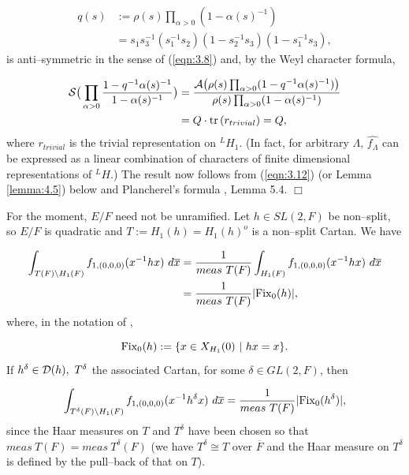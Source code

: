 \documentclass[12pt,letterpaper]{article}
\def\ddd{{\cal D}}
\def\sss{{\cal S}}
\def\qed{$\Box$}
\def\ovF{\overline{F}}
\def\ovx{\overline{x}}
\begin{document}
\begin{equation}
\label{eqn:3.9}
\begin{split}
q(s)
&:=\rho (s)\prod_{\alpha >0}(1-\alpha (s)^{-1})\\
&=s_1s_3^{-1}(s_1^{-1}s_2)(1-s_2^{-1}s_3)(1-s_1^{-1}s_3),
\end{split}
\end{equation}
is anti--symmetric in the sense of (\ref{eqn:3.8}) and, by the Weyl character
formula,

\begin{equation}
\label{eqn:3.10}
\begin{split}
\sss \big(\prod_{\alpha >0}
{1-q^{-1}\alpha (s)^{-1}\over{1-\alpha (s)^{-1}}}\big)
&={{{\cal A} \big(\rho (s)\prod_{\alpha >0}(1-q^{-1}\alpha (s)^{-1})\big)}
\over{\rho (s)\prod_{\alpha >0}(1-\alpha (s)^{-1})}}\\
&=Q\cdot {\rm tr}\, (r_{trivial}) = Q,
\end{split}
\end{equation}
where $r_{trivial}$ is the trivial representation on $^{L}H_1$.
(In fact, for arbitrary $\Lambda$, $\hat{f_{\Lambda}}$ can be expressed
as a linear combination of characters of finite dimensional representations 
of $^{L}H$.) The result now
follows from (\ref{eqn:3.12}) (or Lemma \ref{lemma:4.5}) below and
Plancherel's formula \cite{La3}, Lemma 5.4.
\qed

 
For the moment, $E/F$ need not be unramified. 
Let $h\in SL(2,F)$ be non--split,
so $E/F$ is quadratic and $T:=H_1(h)=H_1(h)^o$ is a non--split Cartan. 
We have

\begin{equation}
\label{eqn:3.11}
\begin{split}
\int_{T(F)\setminus H_1(F)} f_{1,(0,0,0)}(x^{-1}hx)\ d\ovx
&={1\over{meas\ T(F)}}
\int_{H_1(F)} f_{1,(0,0,0)}(x^{-1}hx)\ d\ovx\\
&={1\over{meas\ T(F)}}|{\rm Fix} _0(h)|,
\end{split}
\end{equation}
where, in the notation of \cite{Ko2},

\[
{\rm Fix}_0(h):=\{x\in X_{H_1}(0)\ |\ hx=x\}.
\]
If $h^\delta\in \ddd (h),\ T^\delta$ the associated Cartan, for some
$\delta\in GL(2,F)$, then

\[
\int_{T^\delta (F)\setminus H_1(F)} f_{1,(0,0,0)}(x^{-1}h^\delta x)\ d\ovx
= {1\over{meas\ T(F)}}|{\rm Fix} _0(h^\delta )|,
\]
since the Haar measures on $T$ and $T^\delta $ have been chosen so that
$meas\ T(F)=meas\ T^\delta (F)$ (we have $T^\delta \cong T$ over $\ovF$ and
the Haar measure on $T^\delta $ is defined by the pull--back of that 
on $T$).
 
\end{document}

